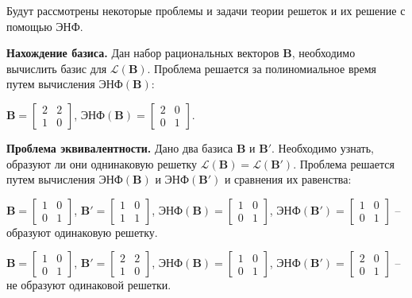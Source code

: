 Будут рассмотрены некоторые проблемы и задачи теории решеток и их решение с помощью ЭНФ.

\textbf{Нахождение базиса.} Дан набор рациональных векторов $ \mathbf{B} $, необходимо вычислить базис для $ \mathcal{L}(\mathbf{B}) $. Проблема решается за полиномиальное время путем вычисления $ \text{ЭНФ}(\mathbf{B}) $: 

$ \mathbf{B} = \left[\begin{array}{cccc}
2 & 2 \\
1 & 0
\end{array}\right] $, 
$ \text{ЭНФ}(\mathbf{B}) = \left[\begin{array}{cccc}
2 & 0 \\
0 & 1
\end{array}\right] $.

\textbf{Проблема эквивалентности.} Дано два базиса $ \mathbf{B} $ и $ \mathbf{B}' $. Необходимо узнать, образуют ли они однинаковую решетку $ \mathcal{L}(\mathbf{B}) = \mathcal{L}(\mathbf{B}') $. Проблема решается путем вычисления $ \text{ЭНФ}(\mathbf{B}) $ и $ \text{ЭНФ}(\mathbf{B}') $ и сравнения их равенства:

$ \mathbf{B} = \left[\begin{array}{cccc}
1 & 0 \\
0 & 1
\end{array}\right] $, 
$ \mathbf{B}' = \left[\begin{array}{cccc}
1 & 0 \\
1 & 1
\end{array}\right] $, 
$ \text{ЭНФ}(\mathbf{B}) = \left[\begin{array}{cccc}
1 & 0 \\
0 & 1
\end{array}\right] $,
$ \text{ЭНФ}(\mathbf{B}') = \left[\begin{array}{cccc}
1 & 0 \\
0 & 1
\end{array}\right] $ -- образуют одинаковую решетку.

$ \mathbf{B} = \left[\begin{array}{cccc}
1 & 0 \\
0 & 1
\end{array}\right] $, 
$ \mathbf{B}' = \left[\begin{array}{cccc}
2 & 2 \\
1 & 0
\end{array}\right] $, 
$ \text{ЭНФ}(\mathbf{B}) = \left[\begin{array}{cccc}
1 & 0 \\
0 & 1
\end{array}\right] $,
$ \text{ЭНФ}(\mathbf{B}') = \left[\begin{array}{cccc}
2 & 0 \\
0 & 1
\end{array}\right] $ -- не образуют одинаковой решетки.

